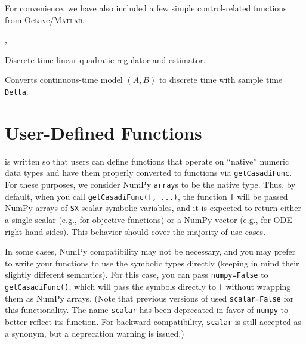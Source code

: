 \documentclass{article}
\begin{document}
\begin{multicols}{2}
For convenience, we have also included a few simple control-related functions from Octave/\textsc{Matlab}.

, 

Discrete-time linear-quadratic regulator and estimator.


Converts continuous-time model $(A,B)$ to discrete time with sample time \texttt{Delta}.

\end{multicols}

\section{User-Defined Functions} \label{sec:functions}

\mpctools{} is written so that users can define functions that operate on ``native'' numeric data types and have them properly converted to \casadi{} functions via \lstinline|getCasadiFunc|.
For these purposes, we consider NumPy \lstinline|array|s to be the native type.
Thus, by default, when you call \lstinline|getCasadiFunc(f, ...)|, the function \lstinline|f| will be passed NumPy arrays of \casadi{} \lstinline|SX| scalar symbolic variables, and it is expected to return either a single scalar (e.g., for objective functions) or a NumPy vector (e.g., for ODE right-hand sides).
This behavior should cover the majority of use cases.

In some cases, NumPy compatibility may not be necessary, and you may prefer to write your functions to use the \casadi{} symbolic types directly (keeping in mind their slightly different semantics).
For this case, you can pass \lstinline|numpy=False| to \lstinline|getCasadiFunc()|, which will pass the \casadi{} symbols directly to \lstinline|f| without wrapping them as NumPy arrays.
(Note that previous versions of \mpctools{} used \lstinline|scalar=False| for this functionality.
The name \lstinline|scalar| has been deprecated in favor of \lstinline|numpy| to better reflect its function.
For backward compatibility, \lstinline|scalar| is still accepted as a synonym, but a deprecation warning is issued.)
\end{document}
